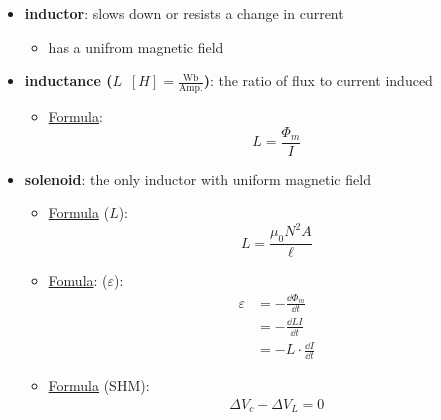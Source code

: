 \documentclass{article}
\begin{document}
      \begin{itemize}
        \item \textbf{inductor}: slows down or resists a change in current
          \begin{itemize}
            \item has a unifrom magnetic field
          \end{itemize} 
        \item \textbf{inductance ($L\enspace[H]=\frac{\mathrm{Wb}}{\mathrm{Amp.}}$)}: the ratio of flux to current induced
          \begin{itemize}
            \item \underline{Formula}:
            $$L=\frac{\Phi_m}{I}$$
          \end{itemize}
        \item \textbf{solenoid}: the only inductor with uniform magnetic field
          \begin{itemize}
            \item \underline{Formula} ($L$):
            $$L=\frac{\mu_0 N^2 A}{\ell}$$
            \item \underline{Fomula}: ($\varepsilon$):
              \begin{align*}
                \varepsilon &= - \frac{\dd \Phi_m}{\dd t}\\
                 & = - \frac{\dd LI}{\dd t}\\
                 & = \boxed{-L\cdot \frac{\dd I}{\dd t}}
              \end{align*}
            \item \underline{Formula} (SHM):
              \begin{align*}
                \Delta V_c - \Delta V_L = 0
              \end{align*}
          \end{itemize}
        \begin{figure}[H]
          \centering

\end{figure}
\end{itemize}
\end{document}
